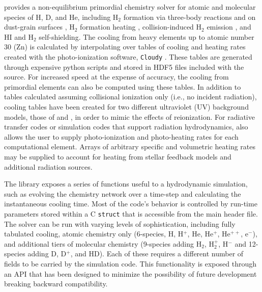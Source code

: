 \grackle{} provides a non-equilibrium primordial chemistry solver for
atomic and molecular species of H, D, and He, including H$_{2}$
formation via three-body reactions \citep{2002Sci...295...93A,
2011ApJ...726...55T} and on dust-grain surfaces
\citep{1979ApJS...41..555H, 2000ApJ...534..809O, 2014ApJ...783...75M},
H$_{2}$ formation 
heating \citep{2009Sci...325..601T}, collision-induced H$_{2}$
emission \citep{2004MNRAS.348.1019R}, and HI
\citep{2013MNRAS.430.2427R} and H$_{2}$ \citep{2012MNRAS.425L..51W}
self-shielding.  The cooling from heavy elements up to atomic number
30 (Zn) is calculated by interpolating over tables of cooling and
heating rates created with the photo-ionization software,
\texttt{Cloudy} \citep{2013RMxAA..49..137F}.  These
tables are generated through expensive python scripts and stored in HDF5 files
included with the \grackle{} source.  For
increased speed at the expense of accuracy, the cooling from
primordial elements can also be computed using these tables.  In
addition to tables calculated assuming collisional ionization only
(i.e., no incident radiation), cooling tables have been created for two
different ultraviolet (UV) background models, those of \citet{2009ApJ...703.1416F}
and \citet{2012ApJ...746..125H}, in order to mimic the effects of
reionization.  For radiative transfer codes or simulation codes that
support radiation hydrodynamics, \grackle{} also allows the user to supply
photo-ionization and photo-heating rates for each computational
element.  Arrays of arbitrary specific and volumetric heating
rates may be supplied to account for heating from stellar feedback
models and additional radiation sources.

The \grackle{} library exposes a series of functions useful to a
hydrodynamic simulation, such as evolving the chemistry network over a
time-step and calculating the instantaneous cooling time.
Most of the
code's behavior is controlled by run-time parameters stored within a C
\texttt{struct} that is accessible from the main \grackle{} header
file.  The solver can be run with varying levels of sophistication,
including fully tabulated cooling, atomic chemistry only (6-species,
H, H$^{+}$, He, He$^{+}$, He$^{++}$, e$^{-}$), and additional tiers of
molecular chemistry (9-species adding H$_{2}$, H$_{2}^{+}$, H$^{-}$
and 12-species adding D, D$^{+}$, and HD).  Each of these requires a
different number of fields to be carried by the simulation code.  This
functionality is exposed through an API that has been designed to
minimize the possibility of future development breaking backward
compatibility.

